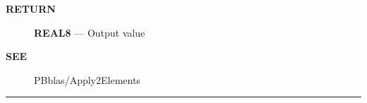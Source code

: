 \par
\begin{description}
\item [\colorbox{tagtype}{\color{white} \textbf{\textsf{RETURN}}}] \textbf{REAL8} --- Output value
\end{description}







\par
\begin{description}
\item [\colorbox{tagtype}{\color{white} \textbf{\textsf{SEE}}}] PBblas/Apply2Elements
\end{description}



\rule{\linewidth}{0.5pt}
